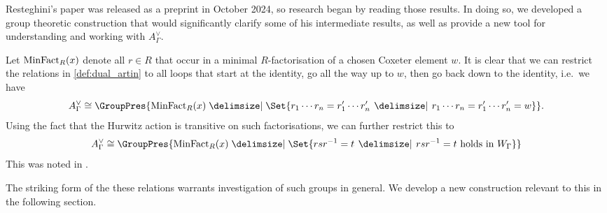 Resteghini's paper \cite{resteghini_free_2024} was released as a preprint in October 2024, so research began by reading those results.
In doing so, we developed a group theoretic construction that would significantly clarify some of his intermediate results, as well as provide a new tool for understanding and working with $A^\vee_\Gamma$.

Let $\operatorname{MinFact}_R(x)$ denote all  $r \in R$ that occur in a minimal  $R$-factorisation of a chosen Coxeter element  $w$.
It is clear that we can restrict the relations in \cref{def:dual_artin} to all loops that start at the identity, go all the way up to $w$, then go back down to the identity, i.e.~we have
\[
	A^\vee_\Gamma \cong \GroupPres{ \minfact_R(x) \relations \Set{r_1\cdots r_n = r^\prime_1 \cdots r^\prime_n \given r_1 \cdots r_n = r^\prime_1 \cdots r^\prime_n = w}}
	.\]
Using the fact that the Hurwitz action is transitive on such factorisations, we can further restrict this to
\[
	A^\vee_\Gamma \cong \GroupPres{ \minfact_R(x) \relations \Set{rsr^{-1} = t \given rs r ^{-1} = t \text{ holds in } W_\Gamma}}
\]
This was noted in \cite[Lemma 7.11]{bessis_topology_2004}.

The striking form of the these relations warrants investigation of such groups in general.
We develop a new construction relevant to this in the following section.


